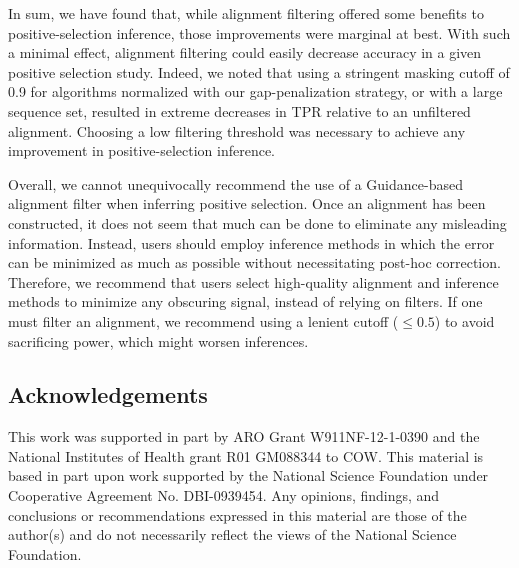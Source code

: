 \documentclass[11pt]{article}
\begin{document}
In sum, we have found that, while alignment filtering offered some benefits to positive-selection inference, those improvements were marginal at best. With such a minimal effect, alignment filtering could easily decrease accuracy in a given positive selection study. Indeed, we noted that using a stringent masking cutoff of 0.9 for algorithms normalized with our gap-penalization strategy, or with a large sequence set, resulted in extreme decreases in TPR relative to an unfiltered alignment. Choosing a low filtering threshold was necessary to achieve any improvement in positive-selection inference.  

Overall, we cannot unequivocally recommend the use of a Guidance-based alignment filter when inferring positive selection. Once an alignment has been constructed, it does not seem that much can be done to eliminate any misleading information. Instead, users should employ inference methods in which the error can be minimized as much as possible without necessitating post-hoc correction. Therefore, we recommend that users select high-quality alignment and inference methods to minimize any obscuring signal, instead of relying on filters. If one must filter an alignment, we recommend using a lenient cutoff ($\leq0.5$) to avoid sacrificing power, which might worsen inferences.



\subsection*{Acknowledgements}
This work was supported in part by ARO Grant W911NF-12-1-0390 and the National Institutes of Health grant R01 GM088344 to COW. This material is based in part upon work supported by the National Science Foundation under Cooperative Agreement No. DBI-0939454. Any opinions, findings, and conclusions or recommendations expressed in this material are those of the author(s) and do not necessarily reflect the views of the National Science Foundation.



	
\end{document}
